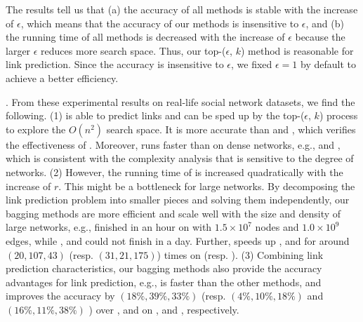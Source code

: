 The results tell us that (a) the accuracy of all methods is stable with
the increase of $\epsilon$, which means that the accuracy of our methods is insensitive
to $\epsilon$, and (b) the running time of all methods is decreased with the increase of $\epsilon$
because the larger $\epsilon$ reduces more search space. Thus, our top-($\epsilon$, $k$)
method is reasonable for link prediction. Since the accuracy is insensitive to $\epsilon$, we
fixed $\epsilon = 1$ by default to achieve a better efficiency.






. From these experimental results on real-life social network datasets,
we find the following. (1) \NMF is able to predict links and can be sped up
by the top-($\epsilon$, $k$) process to explore the $O(n^2)$ search space. It is
more accurate than \Aa and \BIGCLAM, which verifies the effectiveness
of \NMF. Moreover, \NMF runs faster than \BIGCLAM on dense networks,
e.g., \Flickr and \Wikipedia, which is consistent with the complexity analysis
that \BIGCLAM is sensitive to the degree of networks. (2) However, the running time of
\NMF is increased quadratically with the increase of $r$. This might be a bottleneck
for large networks. By decomposing the link prediction problem into smaller pieces
and solving them independently, our bagging methods are more efficient and
scale well with the size and density of large networks,
e.g., \Biased finished in an hour on \Friendster with $1.5\times 10^7$ nodes and
$1.0\times 10^9$ edges, while \NMF, \Aa  and \BIGCLAM could not finish in a day. Further, \Biased speeds up \NMF, \Aa and \BIGCLAM
for around $(20, 107, 43)$ (resp. $(31, 21, 175)$) times on \Twitter (resp. \Friendster).
(3) Combining link prediction characteristics, our
bagging methods also provide the accuracy advantages for link prediction,
e.g., \Biased is faster than the other methods, and improves the accuracy by
$(18\%, 39\%, 33\%)$ (resp. $(4\%, 10\%, 18\%)$ and $(16\%, 11\%, 38\%)$ )
over \NMF, \Aa and \BIGCLAM on \YouTube, \Flickr and \Wikipedia,
respectively.






%
%
%
%
%
%


